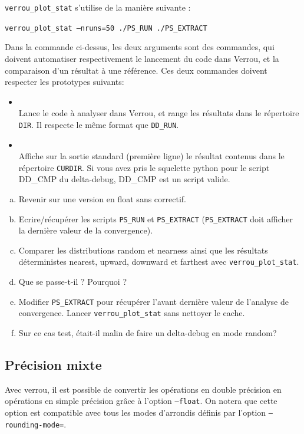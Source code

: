 \documentclass[a4paper]{article}
\newcounter{Question}
\newenvironment{question}[1][\unskip]{
  \bigskip
  \stepcounter{Question}
  \def\questionTitle{ #1}
  \begin{mdframed}[style=question]
  }{
  \end{mdframed}
}
\begin{document}
\texttt{verrou\_plot\_stat} s'utilise de la manière suivante :
\begin{center}
  \tt verrou\_plot\_stat --nruns=50 ./PS\_RUN ./PS\_EXTRACT
\end{center}

Dans la commande ci-dessus, les deux arguments sont des commandes, qui doivent
automatiser respectivement le lancement du code dans Verrou, et la comparaison
d'un résultat à une référence. Ces deux commandes doivent respecter les
prototypes suivants: \medskip
\begin{itemize}
\item[\tt PS\_RUN DIR]\strut\\
  Lance le code à analyser dans Verrou, et range les résultats dans le
  répertoire \texttt{DIR}. Il respecte le même format que \texttt{DD\_RUN}.
  \medskip
\item[\tt PS\_EXTRACT CURDIR]\strut\\
  Affiche sur la sortie standard (première ligne) le résultat contenus dans le répertoire
  \texttt{CURDIR}. Si vous avez pris le squelette python pour le script DD\_CMP du delta-debug, DD\_CMP
  est un script valide.
\end{itemize}

\begin{question}
\begin{enumerate}[(a)]
  \item Revenir sur une version en float sans correctif.
  \item Ecrire/récupérer les scripts \texttt{PS\_RUN} et
    \texttt{PS\_EXTRACT} (\texttt{PS\_EXTRACT} doit afficher la
    dernière valeur de la convergence). 
  \item Comparer les distributions random et nearness ainsi que les
    résultats déterministes nearest, upward, downward et farthest avec
    \texttt{verrou\_plot\_stat}. 
  \item Que se passe-t-il ? Pourquoi ?
  \item Modifier \texttt{PS\_EXTRACT} pour récupérer l'avant dernière
    valeur de l'analyse de convergence. Lancer
    \texttt{verrou\_plot\_stat} sans nettoyer le cache. 
  \item Sur ce cas test, était-il malin de faire un delta-debug en mode random?
\end{enumerate}
\end{question}


\subsection{Précision mixte}
Avec verrou, il est possible de convertir les opérations en double
précision en opérations en simple précision grâce à l'option
\texttt{--float}. On notera que cette option est compatible avec tous
les modes d'arrondis définis par l'option \texttt{--rounding-mode=}.
\end{document}
